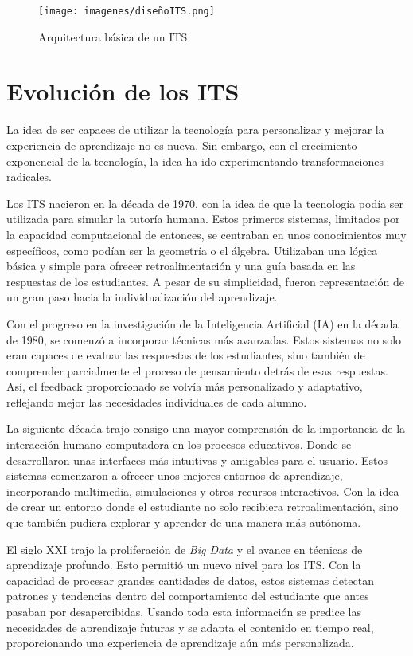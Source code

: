 \begin{figure}[H]
    \centering
    \texttt{[image: imagenes/diseñoITS.png]}
    \caption{Arquitectura básica de un ITS \cite{Butz2006}}
    \label{fig:arqITS}
\end{figure}

\section{Evolución de los ITS}

La idea de ser capaces de utilizar la tecnología para personalizar y mejorar la experiencia de aprendizaje no es nueva. Sin embargo, con el crecimiento exponencial de la tecnología, la idea ha ido experimentando transformaciones radicales.

Los ITS nacieron en la década de 1970, con la idea de que la tecnología podía ser utilizada para simular la tutoría humana. Estos primeros sistemas, limitados por la capacidad computacional de entonces, se centraban en unos conocimientos muy específicos, como podían ser la geometría o el álgebra. Utilizaban una lógica básica y simple para ofrecer retroalimentación y una guía basada en las respuestas de los estudiantes. A pesar de su simplicidad, fueron representación de un gran paso hacia la individualización del aprendizaje.

Con el progreso en la investigación de la Inteligencia Artificial (IA) en la década de 1980, se comenzó a incorporar técnicas más avanzadas. Estos sistemas no solo eran capaces de evaluar las respuestas de los estudiantes, sino también de comprender parcialmente el proceso de pensamiento detrás de esas respuestas. Así, el feedback proporcionado se volvía más personalizado y adaptativo, reflejando mejor las necesidades individuales de cada alumno.

La siguiente década trajo consigo una mayor comprensión de la importancia de la interacción humano-computadora en los procesos educativos. Donde se desarrollaron unas interfaces más intuitivas y amigables para el usuario. Estos sistemas comenzaron a ofrecer unos mejores entornos de aprendizaje, incorporando multimedia, simulaciones y otros recursos interactivos. Con la idea de crear un entorno donde el estudiante no solo recibiera retroalimentación, sino que también pudiera explorar y aprender de una manera más autónoma.

El siglo XXI trajo la proliferación de \textit{Big Data} y el avance en técnicas de aprendizaje profundo. Esto permitió un nuevo nivel para los ITS. Con la capacidad de procesar grandes cantidades de datos, estos sistemas detectan patrones y tendencias dentro del comportamiento del estudiante que antes pasaban por desapercibidas. Usando toda esta información se predice las necesidades de aprendizaje futuras y se adapta el contenido en tiempo real, proporcionando una experiencia de aprendizaje aún más personalizada.

